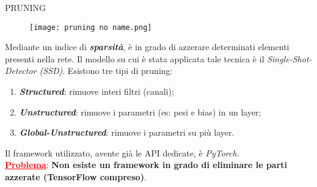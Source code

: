 \begin{frame}{PRUNING}
    \begin{figure}
        \texttt{[image: pruning no name.png]}
    \end{figure}
    Mediante un indice di {\bfseries{\emph{sparsità}}}, è in grado di azzerare determinati elementi presenti nella rete.
    Il modello su cui è stata applicata tale tecnica è il \emph{Single-Shot-Detector (SSD)}.
    Esistono tre tipi di pruning:
    \begin{enumerate}
        \item {\bfseries{\emph{Structured}}}: rimuove interi filtri (canali);
        \item {\bfseries{\emph{Unstructured}}}: rimuove i parametri (es: pesi e bias) in un layer;
        \item {\bfseries{\emph{Global-Unstructured}}}: rimuove i parametri su più layer.
    \end{enumerate}
    Il framework utilizzato, avente già le API dedicate, è \emph{PyTorch}.\\
    \vspace{0.2cm}
    {\textcolor{red}{\textbf{\ul{Problema}}}}: {\bfseries{Non esiste un framework in grado di eliminare le parti azzerate (TensorFlow compreso)}}.
\end{frame}